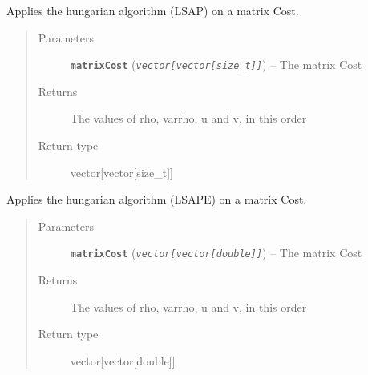 \documentclass[letterpaper,10pt,english]{sphinxmanual}
\begin{document}
\begin{fulllineitems}
\label{doc:PythonGedLib.PyHungarianLSAP}
Applies the hungarian algorithm (LSAP) on a matrix Cost.
\begin{quote}\begin{description}
\item[{Parameters}] \leavevmode
\textbf{\texttt{matrixCost}} (\emph{\texttt{vector{[}vector{[}size\_t{]}{]}}}) -- The matrix Cost

\item[{Returns}] \leavevmode
The values of rho, varrho, u and v, in this order

\item[{Return type}] \leavevmode
vector{[}vector{[}size\_t{]}{]}

\end{description}\end{quote}

\end{fulllineitems}


\begin{fulllineitems}
\label{doc:PythonGedLib.PyHungarianLSAPE}
Applies the hungarian algorithm (LSAPE) on a matrix Cost.
\begin{quote}\begin{description}
\item[{Parameters}] \leavevmode
\textbf{\texttt{matrixCost}} (\emph{\texttt{vector{[}vector{[}double{]}{]}}}) -- The matrix Cost

\item[{Returns}] \leavevmode
The values of rho, varrho, u and v, in this order

\item[{Return type}] \leavevmode
vector{[}vector{[}double{]}{]}

\end{description}\end{quote}

\end{fulllineitems}

\end{document}

